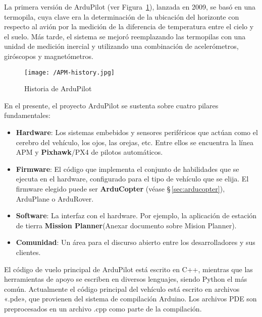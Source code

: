 La primera versión de ArduPilot (ver Figura~\ref{fig:APMHistory}), lanzada en 2009, se basó en una termopila, cuya clave era la determinación de la ubicación del horizonte con respecto al avión por la medición de la diferencia de temperatura entre el cielo y el suelo. Más tarde, el sistema se mejoró reemplazando las termopilas con una unidad de medición inercial y utilizando una combinación de acelerómetros, giróscopos y magnetómetros.

\begin{figure}[!h]
\begin{center}
\texttt{[image: /APM-history.jpg]}
\caption[Historia de ArduPilot]{Historia de ArduPilot \footnotemark}
\label{fig:APMHistory}
\end{center}
\end{figure}


En el presente, el proyecto ArduPilot se sustenta sobre cuatro pilares fundamentales:

\begin{itemize}
\item \textbf{Hardware}: Los sistemas embebidos y sensores periféricos que actúan como el cerebro del vehículo, los ojos, las orejas, etc. Entre ellos se encuentra la línea APM y \textbf{Pixhawk}/PX4 de pilotos automáticos.
\item \textbf{Firmware}: El código que implementa el conjunto de habilidades que se ejecuta en el hardware, configurado para el 
tipo de vehículo que se elija. El firmware elegido puede ser \textbf{ArduCopter} (véase \S\,\ref{sec:arducopter}), ArduPlane o ArduRover.
\item \textbf{Software}: La interfaz con el hardware. Por ejemplo, la aplicación de estación de tierra \textbf{Mission Planner}(Anexar documento sobre Mision Planner).
\item \textbf{Comunidad}: Un área para el discurso abierto entre los desarrolladores y sus clientes.
\end{itemize}

El código de vuelo principal de ArduPilot está escrito en C++, mientras que las herramientas de apoyo se escriben en diversos lenguajes, siendo Python el más común. Actualmente el código principal del vehículo está escrito en archivos «.pde», que provienen del sistema de compilación Arduino. Los archivos PDE son preprocesados en un archivo .cpp como parte de la compilación.

